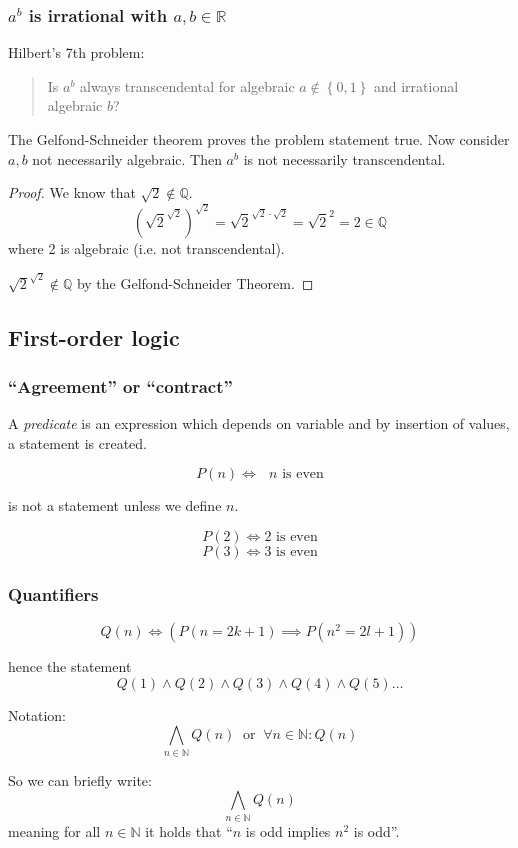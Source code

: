 \documentclass[a4paper,landscape,twocolumn]{article}
\newcommand\set[1]{\left\{#1\right\}}
\begin{document}
\subsubsection{$a^b$ is irrational with $a, b \in \mathbb{R}$}
%
Hilbert's 7th problem:
\begin{quote}
  Is $a^b$ always transcendental for algebraic $a \not\in \set{0,1}$
  and irrational algebraic $b$?
\end{quote}
The Gelfond-Schneider theorem proves the problem statement true.
Now consider $a, b$ not necessarily algebraic. Then $a^b$ is not necessarily transcendental.

\begin{proof}
  We know that $\sqrt{2} \not\in \mathbb{Q}$.
  \[
      \left(\sqrt{2}^{\sqrt{2}}\right)^{\sqrt{2}}
      = \sqrt{2}^{\sqrt{2}\cdot\sqrt{2}}
      = \sqrt{2}^2
      = 2 \in \mathbb{Q}
  \]
  where 2 is algebraic (i.e. not transcendental).

  $\sqrt{2}^{\sqrt{2}} \not\in \mathbb Q$ by the Gelfond-Schneider Theorem.
\end{proof}

\subsection{First-order logic}
\subsubsection{\enquote{Agreement} or \enquote{contract}}
%
A \emph{predicate} is an expression which depends on variable and
by insertion of values, a statement is created.

\[ P(n) \iff \text{ $n$ is even} \]

is not a statement unless we define $n$.

\[ P(2) \iff \text{2 is even} \]
\[ P(3) \iff \text{3 is even} \]

\subsubsection{Quantifiers}

\[ Q(n) \iff \left(P(n = 2k + 1) \implies P(n^2 = 2l + 1)\right) \]

hence the statement
\[ Q(1) \land Q(2) \land Q(3) \land Q(4) \land Q(5) \ldots \]

Notation:
\[ \bigwedge_{n \in \mathbb{N}} Q(n) \:\text{ or }\: \forall n \in \mathbb{N}: Q(n) \]

So we can briefly write:
\[ \bigwedge_{n \in \mathbb{N}} Q(n) \]
meaning for all $n \in \mathbb{N}$ it holds that \enquote{$n$ is odd implies $n^2$ is odd}.
\end{document}
